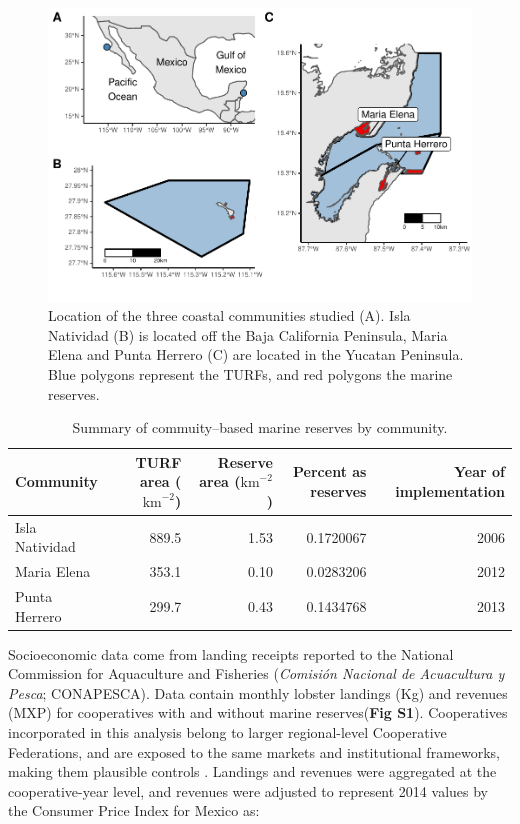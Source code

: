 \documentclass{frontiersSCNS}
\begin{document}
\begin{figure}
\centering
\includegraphics{Villasenor-Derbez_files/figure-latex/unnamed-chunk-1-1.pdf}
\caption{\label{fig:unnamed-chunk-1}\label{fig:map}Location of the three
coastal communities studied (A). Isla Natividad (B) is located off the
Baja California Peninsula, Maria Elena and Punta Herrero (C) are located
in the Yucatan Peninsula. Blue polygons represent the TURFs, and red
polygons the marine reserves.}
\end{figure}

\begin{table}

\caption{\label{tab:unnamed-chunk-2}\label{table:com_sum} Summary of commuity--based marine reserves by community.}
\centering
\begin{tabular}[t]{l|r|r|r|r}
\hline
Community & TURF area ($\mathrm{km}^{-2}$) & Reserve area ($\mathrm{km}^{-2}$) & Percent as reserves & Year of implementation\\
\hline
Isla Natividad & 889.5 & 1.53 & 0.1720067 & 2006\\
\hline
Maria Elena & 353.1 & 0.10 & 0.0283206 & 2012\\
\hline
Punta Herrero & 299.7 & 0.43 & 0.1434768 & 2013\\
\hline
\end{tabular}
\end{table}

Socioeconomic data come from landing receipts reported to the National
Commission for Aquaculture and Fisheries (\emph{Comisión Nacional de
Acuacultura y Pesca}; CONAPESCA). Data contain monthly lobster landings
(Kg) and revenues (MXP) for cooperatives with and without marine
reserves(\textbf{Fig S1}). Cooperatives incorporated in this analysis
belong to larger regional-level Cooperative Federations, and are exposed
to the same markets and institutional frameworks, making them plausible
controls \citep{mccay_2017-1m,ayer_2018}. Landings and revenues were
aggregated at the cooperative-year level, and revenues were adjusted to
represent 2014 values by the Consumer Price Index for Mexico
\citep{oecd_2017-VV} as:
\end{document}
